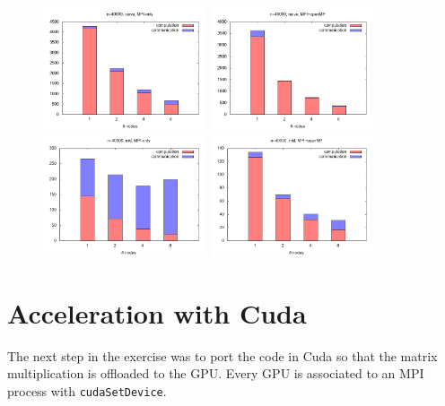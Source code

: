 \documentclass[12pt]{extarticle}
\begin{document}
\begin{figure}[H]
	\centering
	\includegraphics[width=0.43\textwidth]{plot_40000_naive_serial.png} 
	\qquad
	\includegraphics[width=0.43\textwidth]{plot_40000_naive_thread.png} 
	\qquad
	\includegraphics[width=0.43\textwidth]{plot_40000_mkl_serial.png} 
	\qquad
	\includegraphics[width=0.43\textwidth]{plot_40000_mkl_thread.png} 
\end{figure}



\section*{Acceleration with Cuda}  %
The next step in the exercise was to port the code in Cuda so that the matrix multiplication is offloaded to the GPU. Every GPU is associated to an MPI process with \texttt{cudaSetDevice}.%
\end{document}
